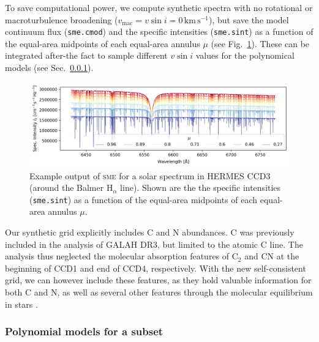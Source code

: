 \documentclass[
  journal=pasa,
  manuscript=research-paper, %
  year=2021,
  volume=37,
]{cup-journal}
\newcommand{\vsini}{$v \sin i$\xspace}
\newcommand{\sme}{\textsc{sme}\xspace}
\newcommand{\kms}{\,\mathrm{km\,s^{-1}}}	%
\begin{document}
To save computational power, we compute synthetic spectra with no rotational or macroturbulence broadening ($v_\text{mac} = v\sin i = 0\kms$), but save the model continuum flux (\texttt{sme.cmod}) and the specific intensities (\texttt{sme.sint}) as a function of the equal-area midpoints of each equal-area annulus $\mu$ (see Fig.~\ref{fig:sme_mu_output}). These can be integrated after-the fact to sample different \vsini values for the polynomical models (see Sec.~\ref{subsubsec:polynomials}).

\begin{figure}[hbt!]
 \centering
 \includegraphics[width=\textwidth]{figures/solar_twin_specific_intensity.png}
 \caption{Example output of \sme for a solar spectrum in HERMES CCD3 (around the Balmer $\mathrm{H}_\alpha$ line). Shown are the the specific intensities (\texttt{sme.sint}) as a function of the equal-area midpoints of each equal-area annulus $\mu$.}
 \label{fig:sme_mu_output}
\end{figure}

Our synthetic grid explicitly includes C and N abundances. C was previously included in the analysis of GALAH DR3, but limited to the atomic C line. The analysis thus neglected the molecular absorption features of $\mathrm{C_2}$ and CN at the beginning of CCD1 and end of CCD4, respectively. With the new self-consistent grid, we can however include these features, as they hold valuable information for both C and N, as well as several other features through the molecular equilibrium in stars \citep[see e.g.][]{Ting2018}.

\subsubsection{Polynomial models for a subset} \label{subsubsec:polynomials}
\end{document}
